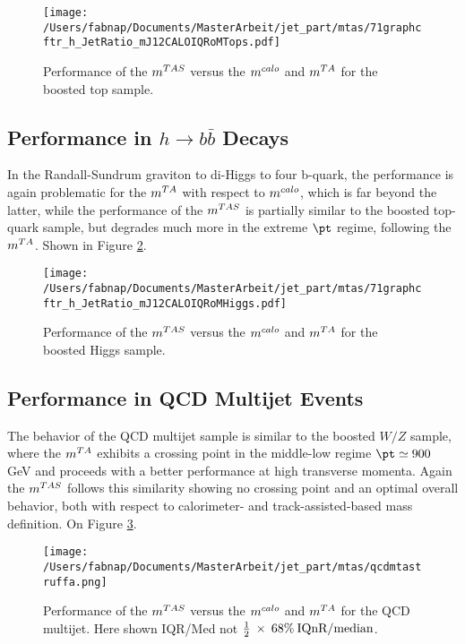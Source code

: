 \begin{figure}[!ht]
  \centering
      \texttt{[image: /Users/fabnap/Documents/MasterArbeit/jet\_part/mtas/71graphcftr\_h\_JetRatio\_mJ12CALOIQRoMTops.pdf]}
  \caption[$\mtas$ for boosted tops]{Performance of the $\mtas$ versus the $m^{calo}$ and $m^{TA}$ for the boosted top sample.}
  \label{fig:mtas3}
\end{figure}
\subsection{Performance in $h\to b\bar{b}$ Decays}
In the Randall-Sundrum graviton to di-Higgs to four b-quark, the performance is again problematic for the $m^{TA}$ with respect to $m^{calo}$, which is far beyond the latter, while the performance of the $\mtas$ is partially similar to the boosted top-quark sample, but degrades much more in the extreme $\pt$ regime, following the $m^{TA}$. Shown in Figure \ref{fig:mtas4}.

\begin{figure}[!ht]
  \centering
      \texttt{[image: /Users/fabnap/Documents/MasterArbeit/jet\_part/mtas/71graphcftr\_h\_JetRatio\_mJ12CALOIQRoMHiggs.pdf]}
  \caption[$\mtas$ for boosted Higgs]{Performance of the $\mtas$ versus the $m^{calo}$ and $m^{TA}$ for the boosted Higgs sample.}
  \label{fig:mtas4}
\end{figure}

\subsection{Performance in QCD Multijet Events}
The behavior of the QCD multijet sample is similar to the boosted $W/Z$ sample, where the $m^{TA}$ exhibits a crossing point in the middle-low regime $\pt\simeq900$ GeV and proceeds with a better performance at high transverse momenta.
Again the $\mtas$ follows this similarity showing no crossing point and an optimal overall behavior, both with respect to calorimeter- and track-assisted-based mass definition. On Figure \ref{fig:mtas5}.

\begin{figure}[!ht]
  \centering
        \texttt{[image: /Users/fabnap/Documents/MasterArbeit/jet\_part/mtas/qcdmtastruffa.png]}
   \caption[$\mtas$ for QCD jets]{Performance of the $\mtas$ versus the $m^{calo}$ and $m^{TA}$ for the QCD multijet. Here shown IQR/Med not $\frac{1}{2}\: \times\: 68\% \:\textrm{IQnR/median}$.}
  \label{fig:mtas5}
\end{figure}

